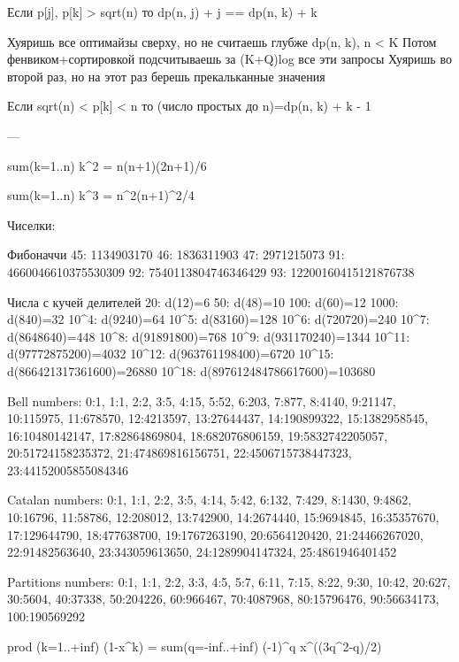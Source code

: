 Если p[j], p[k] > sqrt(n) то dp(n, j) + j == dp(n, k) + k

Хуяришь все оптимайзы сверху, но не считаешь глубже dp(n, k), n < K
Потом фенвиком+сортировкой подсчитываешь за (K+Q)log все эти запросы
Хуяришь во второй раз, но на этот раз берешь прекальканные значения

Если sqrt(n) < p[k] < n то (число простых до n)=dp(n, k) + k - 1

---

sum(k=1..n) k^2 = n(n+1)(2n+1)/6

sum(k=1..n) k^3 = n^2(n+1)^2/4


Чиселки: 

Фибоначчи
45:  1134903170
46:  1836311903
47:  2971215073
91:  4660046610375530309
92:  7540113804746346429
93:  12200160415121876738

Числа с кучей делителей
20: d(12)=6
50: d(48)=10
100: d(60)=12
1000: d(840)=32
10^4: d(9240)=64
10^5: d(83160)=128
10^6: d(720720)=240
10^7: d(8648640)=448
10^8: d(91891800)=768
10^9: d(931170240)=1344
10^{11}: d(97772875200)=4032
10^{12}: d(963761198400)=6720
10^{15}: d(866421317361600)=26880
10^{18}: d(897612484786617600)=103680

Bell numbers:
0:1, 1:1, 2:2, 3:5, 4:15, 5:52, 6:203, 7:877, 8:4140, 9:21147,
10:115975, 11:678570, 12:4213597, 13:27644437, 14:190899322,
15:1382958545, 16:10480142147, 17:82864869804, 18:682076806159,
19:5832742205057, 20:51724158235372, 21:474869816156751,
22:4506715738447323, 23:44152005855084346

Catalan numbers:
0:1, 1:1, 2:2, 3:5, 4:14, 5:42, 6:132, 7:429, 8:1430, 9:4862,
10:16796, 11:58786, 12:208012, 13:742900, 14:2674440,
15:9694845, 16:35357670, 17:129644790, 18:477638700,
19:1767263190, 20:6564120420, 21:24466267020, 22:91482563640,
23:343059613650, 24:1289904147324, 25:4861946401452

Partitions numbers:
0:1, 1:1, 2:2, 3:3, 4:5, 5:7, 6:11, 7:15, 8:22, 9:30, 10:42, 20:627, 30:5604, 40:37338, 50:204226, 60:966467, 70:4087968, 80:15796476, 90:56634173, 100:190569292

prod (k=1..+inf) (1-x^k) = sum(q=-inf..+inf) (-1)^q x^((3q^2-q)/2)